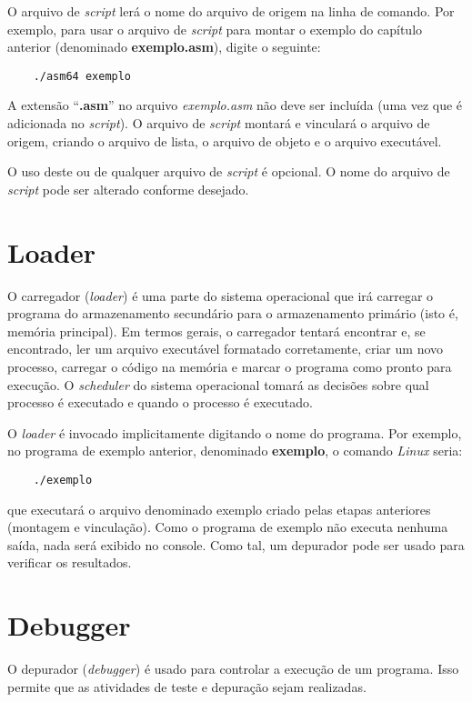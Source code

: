 O arquivo de \textit{script} lerá o nome do arquivo de origem na linha de comando. Por exemplo, para usar o arquivo de \textit{script} para montar o exemplo do capítulo anterior (denominado \textbf{exemplo.asm}), digite o seguinte:
\begin{center}
	\begin{verbatim}
	./asm64 exemplo
	\end{verbatim}
\end{center}

A extensão ``\textbf{.asm}'' no arquivo \textit{exemplo.asm} não deve ser incluída (uma vez que é adicionada no \textit{script}). O arquivo de \textit{script} montará e vinculará o arquivo de origem, criando o arquivo de lista, o arquivo de objeto e o arquivo executável.

O uso deste ou de qualquer arquivo de \textit{script} é opcional. O nome do arquivo de \textit{script} pode ser alterado conforme desejado.

\section{Loader}
O carregador (\textit{loader}) é uma parte do sistema operacional que irá carregar o programa do armazenamento secundário para o armazenamento primário (isto é, memória principal). Em termos gerais, o carregador tentará encontrar e, se encontrado, ler um arquivo executável formatado corretamente, criar um novo processo, carregar o código na memória e marcar o programa como pronto para execução. O \textit{scheduler} do sistema operacional tomará as decisões sobre qual processo é executado e quando o processo é executado.

O \textit{loader} é invocado implicitamente digitando o nome do programa. Por exemplo, no programa de exemplo anterior, denominado \textbf{exemplo}, o comando \textit{Linux} seria:
\begin{center}
	\begin{verbatim}
	./exemplo
	\end{verbatim}
\end{center}
que executará o arquivo denominado exemplo criado pelas etapas anteriores (montagem e vinculação). Como o programa de exemplo não executa nenhuma saída, nada será exibido no console. Como tal, um depurador pode ser usado para verificar os resultados.

\section{Debugger}
O depurador (\textit{debugger}) é usado para controlar a execução de um programa. Isso permite que as atividades de teste e depuração sejam realizadas.

